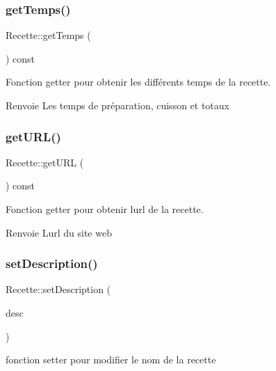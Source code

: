 \subsubsection{\texorpdfstring{get\+Temps()}{getTemps()}}
{\footnotesize\ttfamily Recette\+::get\+Temps (\begin{DoxyParamCaption}{ }\end{DoxyParamCaption}) const}



Fonction getter pour obtenir les différents temps de la recette. 

\begin{DoxyReturn}{Renvoie}
Les temps de préparation, cuisson et totaux 
\end{DoxyReturn}
\mbox{\label{classRecette_ab06006324a8201e9967b53273dbf2751}} 
\subsubsection{\texorpdfstring{get\+U\+R\+L()}{getURL()}}
{\footnotesize\ttfamily Recette\+::get\+U\+RL (\begin{DoxyParamCaption}{ }\end{DoxyParamCaption}) const}



Fonction getter pour obtenir l\textquotesingle{}url de la recette. 

\begin{DoxyReturn}{Renvoie}
L\textquotesingle{}url du site web 
\end{DoxyReturn}
\mbox{\label{classRecette_afb1113cbbe6f3a0cda8eb47a5c9025a4}} 
\subsubsection{\texorpdfstring{set\+Description()}{setDescription()}}
{\footnotesize\ttfamily Recette\+::set\+Description (\begin{DoxyParamCaption}\item[{const Q\+String \&}]{desc }\end{DoxyParamCaption})}



fonction setter pour modifier le nom de la recette 


